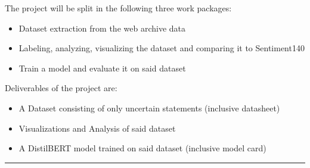 \documentclass[a4paper,12pt,numbers=enddot]{scrartcl}
\begin{document}
The project will be split in the following three work packages:
\begin{itemize}
	\setlength\itemsep{-5pt}
	\item Dataset extraction from the web archive data
	\item Labeling, analyzing, visualizing the dataset and comparing it to Sentiment140
	\item Train a model and evaluate it on said dataset
\end{itemize}

Deliverables of the project are:
\begin{itemize}
	\setlength\itemsep{-5pt}
	\item A Dataset consisting of only uncertain statements (inclusive datasheet)
	\item Visualizations and Analysis of said dataset
	\item A DistilBERT model trained on said dataset (inclusive model card)
\end{itemize}
\medskip

\hrule
\vspace{-2.5em}
\renewcommand{\refname}{}
\nocite{*}

\end{document}
